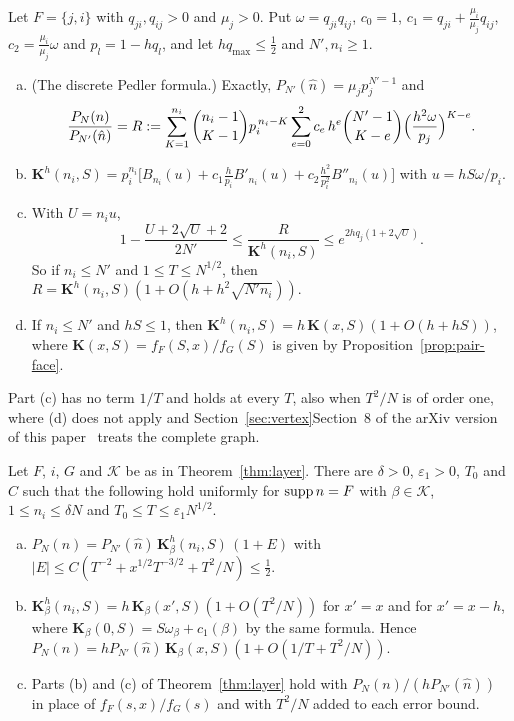 \begin{theorem}\label{thm:pair-counts}
Let $F=\{j,i\}$ with $q_{ji},q_{ij}>0$ and $\mu_j>0$. Put $\omega=q_{ji}q_{ij}$, $c_0=1$,
$c_1=q_{ji}+\frac{\mu_i}{\mu_j}q_{ij}$, $c_2=\frac{\mu_i}{\mu_j}\omega$ and $p_l=1-hq_l$, and let
$hq_{\max}\le\frac12$ and $N',n_i\ge1$.
\begin{enumerate}[(a)]
\item \textup{(The discrete Pedler formula.)} Exactly, $P_{N'}(\hat n)=\mu_jp_j^{N'-1}$ and
\[
\frac{P_N(n)}{P_{N'}(\hat n)}=R:=\sum_{K=1}^{n_i}\binom{n_i-1}{K-1}p_i^{\,n_i-K}\sum_{e=0}^2c_e\,h^e\binom{N'-1}{K-e}\Bigl(\frac{h^2\omega}{p_j}\Bigr)^{K-e}.
\]
\item $\mathbf K^h(n_i,S)=p_i^{n_i}\bigl[B_{n_i}(u)+c_1\frac h{p_i}B'_{n_i}(u)+c_2\frac{h^2}{p_i^2}B''_{n_i}(u)\bigr]$
with $u=hS\omega/p_i$.
\item With $U=n_iu$,
\[
1-\frac{U+2\sqrt U+2}{2N'}\le\frac R{\mathbf K^h(n_i,S)}\le e^{2hq_j(1+2\sqrt U)} .
\]
So if $n_i\le N'$ and $1\le T\le N^{1/2}$, then $R=\mathbf K^h(n_i,S)(1+O(h+h^2\sqrt{N'n_i}))$.
\item If $n_i\le N'$ and $hS\le1$, then $\mathbf K^h(n_i,S)=h\,\mathbf K(x,S)(1+O(h+hS))$, where
$\mathbf K(x,S)=f_F(S,x)/f_G(S)$ is given by Proposition~\ref{prop:pair-face}.
\end{enumerate}
\end{theorem}

Part (c) has no term $1/T$ and holds at every $T$, also when $T^2/N$ is of order one, where (d)
does not apply and \ifarxivbuild Section~\ref{sec:vertex}\else Section~8 of the arXiv version of this
paper~\cite{arxivC1}\fi{} treats the complete graph.

\begin{theorem}\label{thm:layer-counts}
Let $F$, $i$, $G$ and $\mathcal K$ be as in Theorem~\ref{thm:layer}. There are $\delta>0$,
$\varepsilon_1>0$, $T_0$ and $C$ such that the following hold uniformly for $\operatorname{supp} n=F$ with
$\beta\in\mathcal K$, $1\le n_i\le\delta N$ and $T_0\le T\le\varepsilon_1N^{1/2}$.
\begin{enumerate}[(a)]
\item $P_N(n)=P_{N'}(\hat n)\,\mathbf K^h_\beta(n_i,S)\,(1+E)$ with
$|E|\le C(T^{-2}+x^{1/2}T^{-3/2}+T^2/N)\le\frac12$.
\item $\mathbf K^h_\beta(n_i,S)=h\,\mathbf K_\beta(x',S)(1+O(T^2/N))$ for $x'=x$ and for $x'=x-h$, where
$\mathbf K_\beta(0,S)=S\omega_\beta+c_1(\beta)$ by the same formula. Hence
$P_N(n)=hP_{N'}(\hat n)\,\mathbf K_\beta(x,S)(1+O(1/T+T^2/N))$.
\item Parts \textup{(b)} and \textup{(c)} of Theorem~\ref{thm:layer} hold with
$P_N(n)/(hP_{N'}(\hat n))$ in place of $f_F(s,x)/f_G(s)$ and with $T^2/N$ added to each error bound.
\end{enumerate}
\end{theorem}

